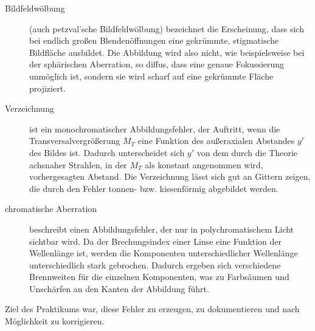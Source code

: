 \begin{description}
	\item[Bildfeldwölbung] (auch petzval'sche Bildfeldwölbung) bezeichnet die Erscheinung, dass sich bei endlich großen Blendenöffnungen eine gekrümmte, stigmatische Bildfläche ausbildet. Die Abbildung wird also nicht, wie beispielsweise bei der sphärischen Aberration, so diffus, dass eine genaue Fokussierung unmöglich ist, sondern sie wird scharf auf eine gekrümmte Fläche projiziert. \cite[432ff.]{hecht2014optik}
	\item[Verzeichnung] ist ein monochromatischer Abbildungsfehler, der Auftritt, wenn die Transversalvergrößerung $M_T$ eine Funktion des außeraxialen Abstandes $y'$ des Bildes ist. Dadurch unterscheidet sich $y'$ von dem durch die Theorie achsnaher Strahlen, in der $M_T$ als konstant angenommen wird, vorhergesagten Abstand. Die Verzeichnung lässt sich gut an Gittern zeigen, die durch den Fehler tonnen- bzw. kissenförmig abgebildet werden. \cite[435ff.]{hecht2014optik}
	\item[chromatische Aberration] beschreibt einen Abbildungsfehler, der nur in polychromatischem Licht sichtbar wird. Da der Brechungsindex einer Linse eine Funktion der Wellenlänge ist, werden die Komponenten unterschiedlicher Wellenlänge unterschiedlich stark gebrochen. Dadurch ergeben sich verschiedene Brennweiten für die einzelnen Komponenten, was zu Farbsäumen und Unschärfen an den Kanten der Abbildung führt. \cite[438ff.]{hecht2014optik}
\end{description}

Ziel des Praktikums war, diese Fehler zu erzeugen, zu dokumentieren und nach Möglichkeit zu korrigieren.
